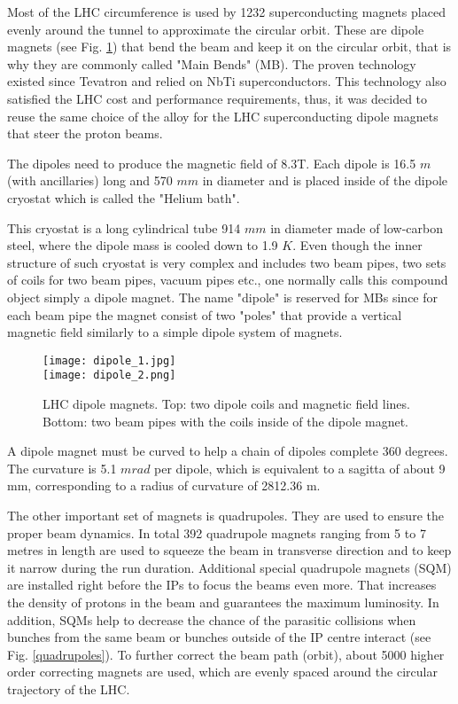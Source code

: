 Most of the LHC circumference is used by 1232 superconducting magnets placed evenly around the tunnel to approximate the circular orbit. These are dipole magnets (see Fig. \ref{dipoles_coils}) that bend the beam and keep it on the circular orbit, that is why they are commonly called "Main Bends" (MB). The proven technology existed since Tevatron and relied on NbTi superconductors. This technology also satisfied the LHC cost and performance requirements, thus, it was decided to reuse the same choice of the alloy for the LHC superconducting dipole magnets that steer the proton beams. 

The dipoles need to produce the magnetic field of 8.3T. %
Each dipole is 16.5 $m$ (with ancillaries) long and 570 $mm$ in diameter and is placed inside of the dipole cryostat which is called the "Helium bath". 

This cryostat is a long cylindrical tube 914 $mm$ in diameter made of low-carbon steel, where the dipole mass is cooled down to 1.9 $K$. Even though the inner structure of such cryostat is very complex and includes two beam pipes, two sets of coils for two beam pipes, vacuum pipes etc., one normally calls this compound object simply a dipole magnet. The name "dipole" is reserved for MBs since for each beam pipe the magnet consist of two "poles" that provide a vertical magnetic field similarly to a simple dipole system of magnets. 

\begin{figure}[H]
\centering
\texttt{[image: dipole\_1.jpg]}\\
\vspace{0.5cm}
\texttt{[image: dipole\_2.png]}
\caption[LHC dipoles]{LHC dipole magnets. Top: two dipole coils and magnetic field lines. Bottom: two beam pipes with the coils inside of the dipole magnet. }
\label{dipoles_coils}
\end{figure}



A  dipole magnet  must  be  curved to help a chain of dipoles complete 360 degrees. The curvature is 5.1 $mrad$ per dipole, which is equivalent to a  sagitta of  about  9 mm, corresponding to a radius of curvature of 2812.36 m.


The other important set of magnets is quadrupoles. They are used to ensure the proper beam dynamics. In total 392 quadrupole magnets ranging from 5 to 7 metres in length are used to squeeze the beam in transverse direction and to keep it narrow during the run duration. Additional special quadrupole magnets (SQM) are installed right before the IPs to focus the beams even more. That increases the density of protons in the beam and guarantees the maximum luminosity. In addition, SQMs help to decrease the chance of the parasitic collisions when bunches from the same beam or bunches outside of the IP centre interact (see Fig. \ref{quadrupoles}). To further correct the beam path (orbit), about 5000 higher order correcting magnets are used, which are evenly spaced around the circular trajectory of the LHC. 


